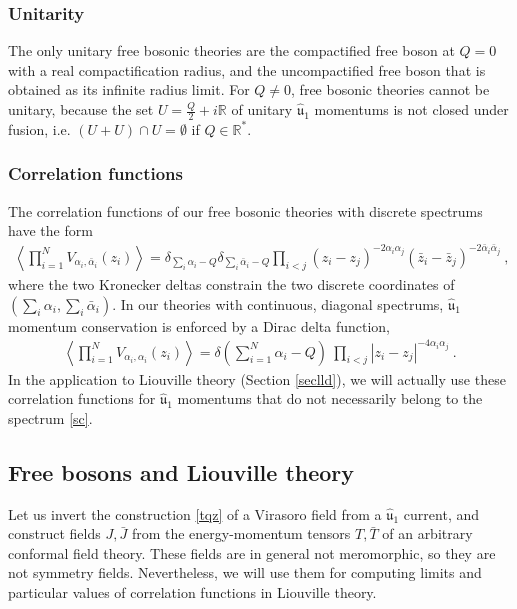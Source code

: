 \documentclass[12pt, a4paper, notitlepage, twoside]{report}
\numberwithin{equation}{section}
\theoremstyle{break}
\begin{document}
\subsubsection{Unitarity}

The only unitary free bosonic theories are the compactified free boson at $Q=0$ with a real compactification radius, and the uncompactified free boson that is obtained as its infinite radius limit. For $Q\neq 0$, free bosonic theories cannot be unitary, because the set $U=\frac{Q}{2}+i\mathbb{R}$ of unitary $\hat{\mathfrak{u}}_1$ momentums is not closed under fusion, i.e. $(U+U)\cap U = \emptyset$ if $Q\in \mathbb{R}^*$.

\subsubsection{Correlation functions}

The correlation functions of our free bosonic theories with discrete spectrums have the form
\begin{align}
 \left\langle \prod_{i=1}^N V_{\alpha_i,\bar\alpha_i}(z_i) \right\rangle = 
 \delta_{\sum_i \alpha_i-Q} \delta_{\sum_i\bar\alpha_i-Q} 
 \prod_{i<j} (z_i-z_j)^{-2\alpha_i\alpha_j}(\bar{z}_i-\bar{z}_j)^{-2\bar{\alpha}_i\bar{\alpha}_j}\ , 
\end{align}
where the two Kronecker deltas constrain the two discrete coordinates of $(\sum_i\alpha_i,\sum_i\bar\alpha_i)$.
In our theories with continuous, diagonal spectrums, $\hat{\mathfrak{u}}_1$ momentum conservation is enforced by a Dirac delta function,
\begin{align}
 \left\langle \prod_{i=1}^N V_{\alpha_i,\alpha_i}(z_i)\right\rangle = \delta\left({\textstyle \sum}_{i=1}^N\alpha_i-Q\right)\ \prod_{i<j} |z_i-z_j|^{-4\alpha_i\alpha_j} \ .
\label{dpzz}
\end{align}
In the application to Liouville theory (Section \ref{seclld}), we will actually use these correlation functions for $\hat{\mathfrak{u}}_1$ momentums that do not necessarily belong to the spectrum \eqref{sc}. 


\subsection{Free bosons and Liouville theory \label{seclld}}

Let us invert the 
construction \eqref{tqz} of a Virasoro field from a $\hat{\mathfrak{u}}_1$ current, and construct fields $J,\bar J$ from the energy-momentum tensors $T,\bar T$ of an arbitrary conformal field theory. 
These fields are in general not meromorphic, so they are not symmetry fields.
Nevertheless, we will use them for computing limits and particular values of correlation functions in Liouville theory.
\end{document}
